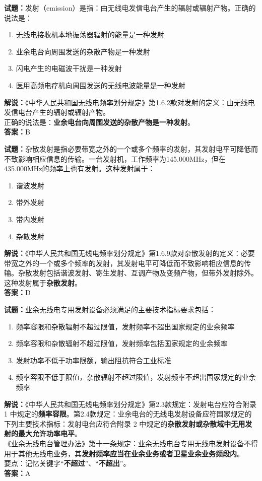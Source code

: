 \documentclass{ctexbook}
\begin{document}
\bigskip

\noindent\textbf{试题：}发射（emission）是指：由无线电发信电台产生的辐射或辐射产物。正确的说法是：
\begin{enumerate}[leftmargin=3em]
  \item 无线电接收机本地振荡器辐射的能量是一种发射
  \item 业余电台向周围发送的杂散产物是一种发射
  \item 闪电产生的电磁波干扰是一种发射
  \item 医用高频电疗机向周围发送的无线电波能量是一种发射
\end{enumerate}
\noindent\textbf{解说：}《中华人民共和国无线电频率划分规定》第1.6.2款对发射的定义：由无线电发信电台产生的辐射或辐射产物。\\正确的说法是：\textbf{业余电台向周围发送的杂散产物是一种发射}。\\\noindent\textbf{答案：}B

\bigskip

\noindent\textbf{试题：}杂散发射是指必要带宽之外的一个或多个频率的发射，其发射电平可降低而不致影响相应信息的传输。一台发射机，工作频率为145.000\si{\MHz}，但在435.000\si{\MHz}的频率上也有发射。这种发射属于：
\begin{enumerate}[leftmargin=3em]
  \item 谐波发射
  \item 带外发射
  \item 带内发射
  \item 杂散发射
\end{enumerate}
\noindent\textbf{解说：}《中华人民共和国无线电频率划分规定》第1.6.9款对杂散发射的定义：必要带宽之外的一个或多个频率的发射，其发射电平可降低而不致影响相应信息的传
输。杂散发射包括谐波发射、寄生发射、互调产物及变频产物，但带外发射除外。\\这种发射属于\textbf{杂散发射}。\\\noindent\textbf{答案：}D

\bigskip

\noindent\textbf{试题：}业余无线电专用发射设备必须满足的主要技术指标要求包括：
\begin{enumerate}[leftmargin=3em]
  \item 频率容限和杂散辐射不超过限值，发射频率不超出国家规定的业余频率
  \item 频率容限和杂散辐射不超过限值，发射频率包括国家规定的业余频率
  \item 发射功率不低于功率限额，输出阻抗符合工业标准
  \item 频率容限不低于限值，杂散辐射不超过限值，发射频率不超出国家规定的业余频率
\end{enumerate}
\noindent\textbf{解说：}《中华人民共和国无线电频率划分规定》第2.3款规定：发射电台应符合附录 1 中规定的\textbf{频率容限}。第2.4款规定：业余电台的无线电发射设备应符国家规定的下列主要技术指标：发射电台应符合附录 2 中规定的\textbf{杂散发射或杂散域中无用发射的最大允许功率电平}。\\《业余无线电台管理办法》第十一条规定：业余无线电台专用无线电发射设备不得用于其他无线电业务，其\textbf{发射频率应当在业余业务或者卫星业余业务频段内}。\\要点：记忆关键字“\textbf{不超过}”、“\textbf{不超出}”。\\\noindent\textbf{答案：}A
\end{document}
